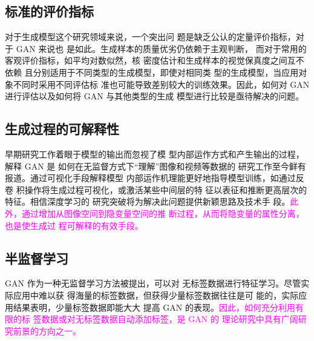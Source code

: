 \subsection{标准的评价指标}
对于生成模型这个研究领域来说，一个突出问
题是缺乏公认的定量评价指标，对于 GAN 来说也
是如此。生成样本的质量优劣仍依赖于主观判断，
而对于常用的客观评价指标，如平均对数似然，核
密度估计和生成样本的视觉保真度之间互不依赖
且分别适用于不同类型的生成模型，即使对相同类
型的生成模型，当应用对象不同时采用不同评估标
准也可能导致差别较大的训练效果。因此，如何对
GAN 进行评估以及如何将 GAN 与其他类型的生成
模型进行比较是亟待解决的问题。
\subsection{生成过程的可解释性}
早期研究工作着眼于模型的输出而忽视了模
型内部运作方式和产生输出的过程，解释 GAN 是
如何在无监督方式下“理解”图像和视频等数据的
研究工作至今鲜有报道。通过可视化手段解释模型
内部运作机理能更好地指导模型训练，如通过反卷
积操作将生成过程可视化，或激活某些中间层的特
征以表征和推断更高层次的特征。相信深度学习的
研究突破将为解决此问题提供新颖思路及技术手
段。\textcolor{magenta}{此外，通过增加从图像空间到隐变量空间的推
断过程，从而将隐变量的属性分离，也是使生成过
程可解释的有效手段。}
\subsection{半监督学习}
GAN 作为一种无监督学习方法被提出，可以对
无标签数据进行特征学习。尽管实际应用中难以获
得海量的标签数据，但获得少量标签数据往往是可
能的，实际应用结果表明，少量标签数据即能大大
提高 GAN 的表现。\textcolor{magenta}{因此，如何充分利用有限的标
签数据或对无标签数据自动添加标签，是 GAN 的
理论研究中具有广阔研究前景的方向之一。}

